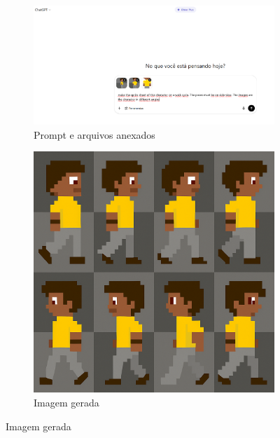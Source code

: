 \begin{figure}[htbp]
    \centering
    \caption{\small Processo da utilização 4 do chatGPT em julho/2025}
    \label{fig:chatGPT5}

    \begin{subfigure}{1\linewidth}
        \includegraphics[width=1\linewidth]{figs/chatGPT/walking_cycle/side_view/tela1.PNG}
        \caption{\small Prompt e arquivos anexados}
        \label{fig:chatGPT5a}
    \end{subfigure}

    \begin{subfigure}{0.5\linewidth}
        \includegraphics[width=1\linewidth]{figs/chatGPT/walking_cycle/side_view/walking cycle 1.png}
        \caption{\small Imagem gerada}
        \label{fig:chatGPT5b}
    \end{subfigure}
\end{figure}

